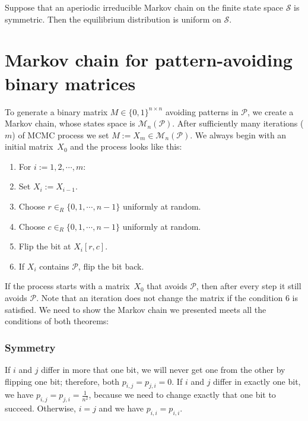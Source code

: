 \begin{thm}
Suppose that an aperiodic irreducible Markov chain on the finite state space $\mathcal{S}$ is symmetric. Then the equilibrium distribution is uniform on $\mathcal{S}$.
\end{thm}
\pagebreak
\section{Markov chain for pattern-avoiding binary matrices}
\label{sect:mmcmc}
To generate a binary matrix $M\in\{0,1\}^{n\times n}$ avoiding patterns in $\mathcal{P}$, we create a Markov chain, whose states space is $\mathcal{M}_n(\mathcal{P})$. After sufficiently many iterations ($m$) of MCMC process we set $M:=X_m\in\mathcal{M}_n(\mathcal{P})$. We always begin with an initial matrix~$X_0$ and the process looks like this:
\begin{enumerate}
\item For $i:=1,2,\cdots,m$:
\item \hspace{5mm} Set $X_{i}:=X_{i-1}$.
\item \hspace{5mm} Choose $r\in_R\{0,1,\cdots,n-1\}$ uniformly at random.
\item \hspace{5mm} Choose $c\in_R\{0,1,\cdots,n-1\}$ uniformly at random.
\item \hspace{5mm} Flip the bit at $X_{i}[r,c]$.
\item \hspace{5mm} If $X_{i}$ contains $\mathcal{P}$, flip the bit back.
\end{enumerate}

If the process starts with a matrix~$X_0$ that avoids $\mathcal{P}$, then after every step it still avoids $\mathcal{P}$. Note that an iteration does not change the matrix if the condition 6 is satisfied. We need to show the Markov chain we presented meets all the conditions of both theorems:
\subsubsection{Symmetry}
If $i$ and $j$ differ in more that one bit, we will never get one from the other by flipping one bit; therefore, both $p_{i,j}=p_{j,i}=0$. If $i$ and $j$ differ in exactly one bit, we have $p_{i,j}=p_{j,i}=\frac{1}{n^2}$, because we need to change exactly that one bit to succeed. Otherwise, $i=j$ and we have $p_{i,i}=p_{i,i}$.

